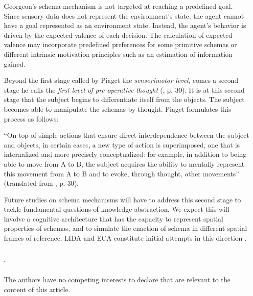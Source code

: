 \documentclass[runningheads]{llncs}
\begin{document}
Georgeon's schema mechanism is not targeted at reaching a predefined goal. Since sensory data does not represent the environment's state, the agent cannot have a goal represented as an environment state. Instead, the agent's behavior is driven by the expected valence of each decision. 
The calculation of expected valence may incorporate predefined preferences for some primitive schemas or different intrinsic motivation principles such as an estimation of information gained. 


Beyond the first stage called by Piaget the \textit{sensorimotor level}, comes a second stage he calls the \textit{first level of pre-operative thought} (\cite{piaget_lepistemologie_2011}, p. 30). 
It is at this second stage that the subject begins to differentiate itself from the objects. 
The subject becomes able to manipulate the schemas by thought. 
Piaget formulates this process as follows: 
\\

\begin{adjustwidth}{1cm}{1cm}
``On top of simple actions that ensure direct interdependence between the subject and objects, in certain cases, a new type of action is superimposed, one that is internalized and more precisely conceptualized: for example, in addition to being able to move from A to B, the subject acquires the ability to mentally represent this movement from A to B and to evoke, through thought, other movements'' (translated from \cite{piaget_lepistemologie_2011}, p. 30).\\

\end{adjustwidth}

Future studies on schema mechanisms will have to address this second stage to tackle fundamental questions of knowledge abstraction. 
We expect this will involve a cognitive architecture that has the capacity to represent spatial properties of schemas, and to simulate the enaction of schema in different spatial frames of reference. LIDA and ECA \cite{georgeon_artificial_2024} constitute initial attempts in this direction . 


\begin{credits}
\subsubsection{\ackname} .

\subsubsection{\discintname}
The authors have no competing interests to declare that are
relevant to the content of this article.
\end{credits}
%
%
%


%
\end{document}
